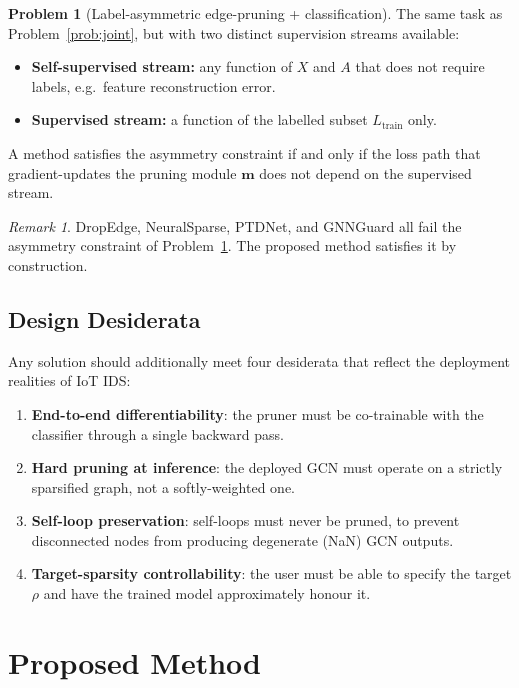 \documentclass[11pt,a4paper]{report}
\theoremstyle{definition}
\newtheorem{problem}{Problem}[chapter]
\theoremstyle{remark}
\newtheorem{remark}{Remark}[chapter]
\begin{document}
\begin{problem}[Label-asymmetric edge-pruning + classification]
\label{prob:asym}
The same task as Problem~\ref{prob:joint}, but with two distinct
supervision streams available:
\begin{itemize}[leftmargin=1.6em]
\item \textbf{Self-supervised stream:} any function of $X$ and $A$ that
does not require labels, e.g.\ feature reconstruction error.
\item \textbf{Supervised stream:} a function of the labelled subset
$L_{\text{train}}$ only.
\end{itemize}
A method satisfies the asymmetry constraint if and only if the loss
path that gradient-updates the pruning module $\bm{m}$ does not depend on
the supervised stream.
\end{problem}

\begin{remark}
DropEdge, NeuralSparse, PTDNet, and GNNGuard all fail the asymmetry
constraint of Problem~\ref{prob:asym}. The proposed method satisfies it
by construction.
\end{remark}

\section{Design Desiderata}

Any solution should additionally meet four desiderata that reflect the
deployment realities of IoT IDS:
\begin{enumerate}[leftmargin=1.6em]
\item \textbf{End-to-end differentiability}: the pruner must be
co-trainable with the classifier through a single backward pass.
\item \textbf{Hard pruning at inference}: the deployed GCN must operate
on a strictly sparsified graph, not a softly-weighted one.
\item \textbf{Self-loop preservation}: self-loops must never be pruned,
to prevent disconnected nodes from producing degenerate (NaN) GCN
outputs.
\item \textbf{Target-sparsity controllability}: the user must be able to
specify the target $\rho$ and have the trained model approximately
honour it.
\end{enumerate}

\chapter{Proposed Method}
\label{ch:method}
\end{document}
